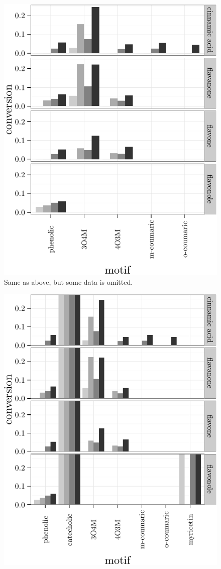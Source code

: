 \documentclass[]{tufte-handout}
\begin{document}
\begin{figure}
 \includegraphics{tufte_files/figure-latex/unnamed-chunk-14-2.pdf}
\caption{Same as above, but some data is omitted.}
\end{figure}\begin{figure}
 \includegraphics{tufte_files/figure-latex/unnamed-chunk-14-3.pdf}

\end{figure}
\end{document}
